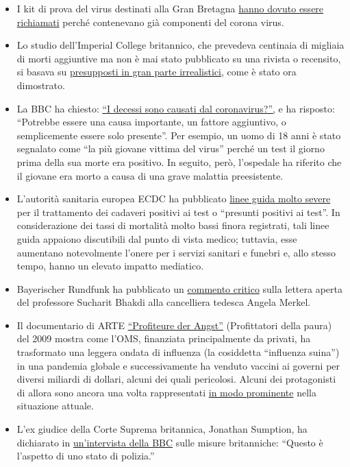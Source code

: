 \begin{itemize}
\tightlist
\item
  I kit di prova del virus destinati alla Gran Bretagna
  \href{https://www.telegraph.co.uk/news/2020/03/30/uks-attempt-ramp-coronavirus-testing-hindered-key-components/}{hanno
  dovuto essere richiamati} perché contenevano già componenti del corona
  virus.
\item
  Lo studio dell'Imperial College britannico, che prevedeva centinaia di
  migliaia di morti aggiuntive ma non è mai stato pubblicato su una
  rivista o recensito, si basava su
  \href{https://judithcurry.com/2020/04/01/imperial-college-uk-covid-19-numbers-dont-seem-to-add-up/}{presupposti
  in gran parte irrealistici}, come è stato ora dimostrato.
\item
  La BBC ha chiesto: \href{https://www.bbc.com/news/health-51979654}{``I
  decessi sono causati dal coronavirus?'',} e ha risposto: ``Potrebbe
  essere una causa importante, un fattore aggiuntivo, o semplicemente
  essere solo presente''. Per esempio, un uomo di 18 anni è stato
  segnalato come ``la più giovane vittima del virus'' perché un test il
  giorno prima della sua morte era positivo. In seguito, però,
  l'ospedale ha riferito che il giovane era morto a causa di una grave
  malattia preesistente.
\item
  L'autorità sanitaria europea ECDC ha pubblicato
  \href{https://www.ecdc.europa.eu/sites/default/files/documents/COVID-19-safe-handling-of-bodies-or-persons-dying-from-COVID19.pdf}{linee
  guida molto severe} per il trattamento dei cadaveri positivi ai test o
  ``presunti positivi ai test''. In considerazione dei tassi di
  mortalità molto bassi finora registrati, tali linee guida appaiono
  discutibili dal punto di vista medico; tuttavia, esse aumentano
  notevolmente l'onere per i servizi sanitari e funebri e, allo stesso
  tempo, hanno un elevato impatto mediatico.
\item
  Bayerischer Rundfunk ha pubblicato un
  \href{https://www.br.de/nachrichten/wissen/bhakdis-brief-an-die-kanzlerin-was-ist-dran-an-seinen-fragen,RutYDhd}{commento
  critico} sulla lettera aperta del professore Sucharit Bhakdi alla
  cancelliera tedesca Angela Merkel.
\item
  Il documentario di ARTE
  \href{https://www.youtube.com/watch?v=1--c2SBYlMY}{``Profiteure der
  Angst''} (Profittatori della paura) del 2009 mostra come l'OMS,
  finanziata principalmente da privati, ha trasformato una leggera
  ondata di influenza (la cosiddetta ``influenza suina'') in una
  pandemia globale e successivamente ha venduto vaccini ai governi per
  diversi miliardi di dollari, alcuni dei quali pericolosi. Alcuni dei
  protagonisti di allora sono ancora una volta rappresentati
  \href{https://www.nature.com/articles/news.2009.424}{in modo
  prominente} nella situazione attuale.
\item
  L'ex giudice della Corte Suprema britannica, Jonathan Sumption, ha
  dichiarato in
  \href{https://www.spectator.co.uk/article/former-supreme-court-justice-this-is-what-a-police-state-is-like-}{un'intervista
  della BBC} sulle misure britanniche: ``Questo è l'aspetto di uno stato
  di polizia.''
\end{itemize}

